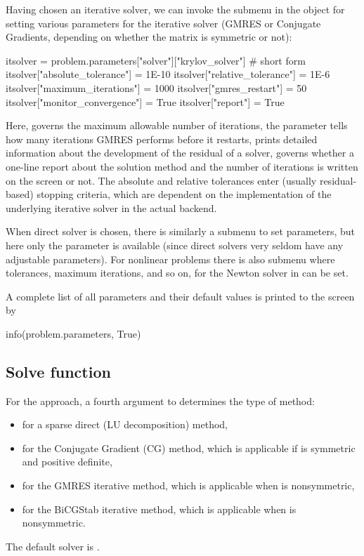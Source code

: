 Having chosen an iterative solver, we can invoke the submenu
 in the  object for setting
various parameters for the iterative solver (GMRES or Conjugate Gradients,
depending on whether the matrix is symmetric or not):
\begin{python}
itsolver = problem.parameters["solver"]["krylov_solver"] # short form
itsolver["absolute_tolerance"] = 1E-10
itsolver["relative_tolerance"] = 1E-6
itsolver["maximum_iterations"] = 1000
itsolver["gmres_restart"] = 50
itsolver["monitor_convergence"] = True
itsolver["report"] = True
\end{python}
Here,   governs the
maximum allowable number of iterations, the
 parameter tells how many
iterations GMRES performs before it restarts,
 prints detailed
information about the development of the residual of a solver,
 governs whether a one-line
report about the solution method and the number of iterations is
written on the screen or not. The absolute and relative tolerances enter
(usually residual-based) stopping criteria, which are dependent on the
implementation of the underlying iterative solver in the actual backend.

When direct solver is chosen, there is similarly a submenu
 to set parameters, but here only the 
parameter is available (since direct solvers very seldom have any
adjustable parameters). For nonlinear problems there is also submenu
 where tolerances, maximum iterations, and so on,
for the Newton solver in  can be set.

A complete list of all parameters and their default values is printed
to the screen by
\begin{python}
info(problem.parameters, True)
\end{python}

\subsection{Solve function}

For the  approach, a fourth argument to 
determines the type of method:
\begin{itemize}
\item {} for a sparse direct (LU decomposition) method,
\item {} for the Conjugate Gradient (CG) method, which is
applicable if  is symmetric and positive definite,
\item {} for
the GMRES iterative method, which is applicable when  is nonsymmetric,
\item {} for the BiCGStab iterative method, which is
  applicable when  is nonsymmetric.
\end{itemize}
The default solver is .


